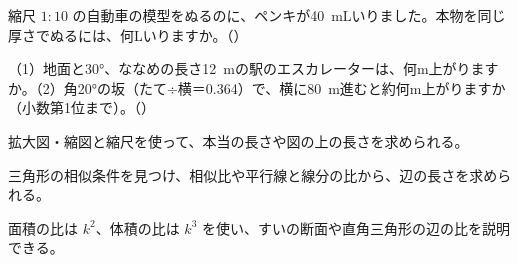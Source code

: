 \bkproblem 縮尺 $1:10$ の自動車の模型をぬるのに、ペンキが\qty{40}{mL}いりました。本物を同じ厚さでぬるには、何Lいりますか。（）

\bkproblem （1）\nobreak 地面と30°、ななめの長さ\qty{12}{m}の駅のエスカレーターは、何m上がりますか。（2）\nobreak 角20°の坂（たて÷横＝0.364）で、横に\qty{80}{m}進むと約何m上がりますか（小数第1位まで）。（）

\begin{furikaeri}
\begin{checklist}
\item 拡大図・縮図と縮尺を使って、本当の長さや図の上の長さを求められる。
\item 三角形の相似条件を見つけ、相似比や平行線と線分の比から、辺の長さを求められる。
\item 面積の比は $k^2$、体積の比は $k^3$ を使い、すいの断面や直角三角形の辺の比を説明できる。
\end{checklist}
\end{furikaeri}


